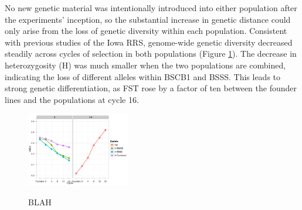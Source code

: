 No new genetic material was intentionally introduced into either population after the experiments’ inception, so the substantial increase in genetic distance could only arise from the loss of genetic diversity within each population. Consistent with previous studies of the Iowa RRS, genome-wide genetic diversity decreased steadily across cycles of selection in both populations (Figure \ref{fig:decline}). The decrease in heterozygosity (H) was much smaller when the two populations are combined, indicating the loss of different alleles within BSCB1 and BSSS. This leads to strong genetic differentiation, as FST rose by a factor of ten between the founder lines and the populations at cycle 16. 

\begin{figure}[tb]   
  \begin{center}
   \vspace{-0mm}
   \includegraphics[width=0.4\textwidth]{fig2}
   \renewcommand{\baselinestretch}{0.9}
   \vspace{-3mm}
   \caption{BLAH} 
\vspace{-6mm}
    \label{fig:decline}
  \end{center}
\end{figure}



